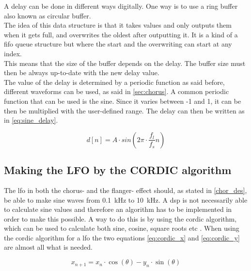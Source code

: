 A delay can be done in different ways digitally. One way is to use a ring buffer also known as circular buffer. \\
The idea of this data structure is that it takes values and only outputs them when it gets full, and overwrites the oldest after outputting it. It is a kind of a \gls{fifo} queue structure but where the start and the overwriting can start at any index. \\
This means that the size of the buffer depends on the delay.  The buffer size must then be always up-to-date with the new delay value. \\ 
The value of the delay is determined by a periodic function as said before, different waveforms can be used, as said in \autoref{sec:chorus}. A common periodic function that can be used is the sine. Since it varies between -1 and 1, it can be then be multiplied with the user-defined range. 
The delay can then be written as in \autoref{eq:sine_delay}.

\begin{equation}\label{eq:sine_delay}
	d[n]= A \cdot sin(2\pi  \cdot \frac{f_{l}}{f_{s}} n)
\end{equation}

\startexplain
    \stopexplain 

\subsection{Making the LFO by the CORDIC algorithm}
The \gls{lfo} in both the chorus- and the flanger- effect should, as stated in \autoref{chor_des}, be able to make sine waves from \SI{0.1}{\kilo\hertz} to \SI{10}{\kilo\hertz}. A \gls{dsp} is not necessarily able to calculate sine values and therefore an algorithm has to be implemented in order to make this possible. A way to do this is by using the \gls{cordic} algorithm, which can be used to calculate both sine, cosine, square roots etc \citep{cordic}. 
When using the \gls{cordic} algorithm for a \gls{lfo} the two equations \autoref{eq:cordic_x} and \autoref{eq:cordic_y} are almost all what is needed.

\begin{equation}
\label{eq:cordic_x}
		x_{n+1} = x_n \cdot \cos(\theta) - y_n \cdot \sin(\theta) 
\end{equation}
\startexplain
    \stopexplain 

